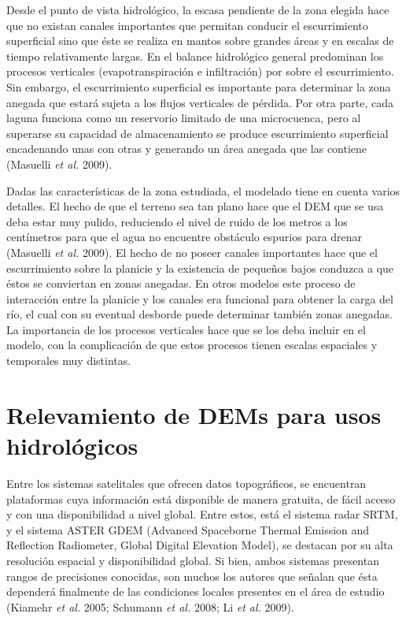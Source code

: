 \documentclass[10pt,a4paper, twoside]{report}
\begin{document}
Desde el punto de vista hidrológico, la escasa pendiente de la zona elegida hace que no existan canales importantes que permitan conducir el escurrimiento superficial sino que éste se realiza en mantos sobre grandes áreas y en escalas de tiempo relativamente largas. En el balance hidrológico general predominan los procesos verticales (evapotranspiración e infiltración) por sobre el escurrimiento. Sin embargo, el escurrimiento superficial es importante para determinar la zona anegada que estará sujeta a los flujos verticales de pérdida. Por otra parte, cada laguna funciona como un reservorio limitado de una microcuenca, pero al superarse su capacidad de almacenamiento se produce escurrimiento superficial encadenando unas con otras y generando un área anegada que las contiene (Masuelli \textit{et al.} 2009).

Dadas las características de la zona estudiada, el modelado tiene en cuenta varios detalles. El hecho de que el terreno sea tan plano hace que el DEM que se usa deba estar muy pulido, reduciendo el nivel de ruido de los metros a los centímetros para que el agua no encuentre obstáculo espurios para drenar (Masuelli \textit{et al.} 2009). El hecho de no poseer canales importantes hace que el escurrimiento sobre la planicie y la existencia de pequeños bajos conduzca a que éstos se conviertan en zonas anegadas. En otros modelos este proceso de interacción entre la planicie y los canales era funcional para obtener la carga del río, el cual con su eventual desborde puede determinar también zonas anegadas. La importancia de los procesos verticales hace que se los deba incluir en el modelo, con la complicación de que estos procesos tienen escalas espaciales y temporales muy distintas.




\section{Relevamiento de DEMs para usos hidrológicos}


Entre los sistemas satelitales que ofrecen datos topográficos, se encuentran plataformas cuya información está disponible de manera gratuita, de fácil acceso y con una disponibilidad a nivel global. Entre estos, está el sistema radar SRTM, y el sistema ASTER GDEM (Advanced Spaceborne Thermal Emission and Reflection Radiometer, Global Digital Elevation Model), se destacan por su alta resolución espacial y disponibilidad global. Si bien, ambos sistemas presentan rangos de precisiones conocidas, son muchos los autores que señalan que ésta dependerá finalmente de las condiciones locales presentes en el área de estudio (Kiamehr \textit{et al.} 2005; Schumann \textit{et al.} 2008; Li \textit{et al.} 2009).
\end{document}
